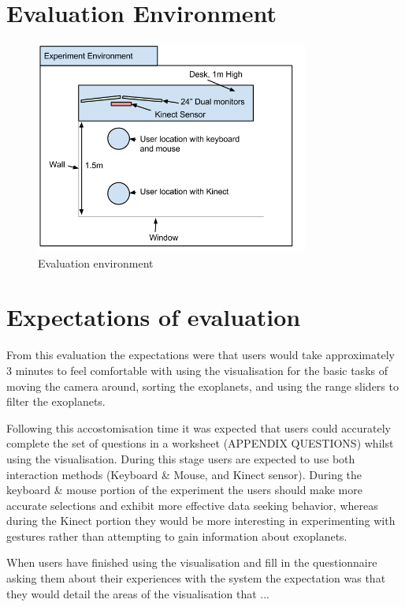 \section{Evaluation Environment}
\begin{figure}[H]
  \centering
      \includegraphics[width=0.8\textwidth]{images/environment.png}
  \caption{Evaluation environment}  
    \label{fig:environment}
\end{figure}

\section{Expectations of evaluation}
From this evaluation the expectations were that users would take approximately 3
minutes to feel comfortable with using the visualisation for the basic tasks of
moving the camera around, sorting the exoplanets, and using the range sliders to
filter the exoplanets. 

Following this accostomisation time it was expected that users could accurately
complete the set of questions in a worksheet (APPENDIX QUESTIONS) whilst using
the visualisation. During this stage users are expected to use both interaction
methods (Keyboard \& Mouse, and Kinect sensor). During the keyboard \& mouse
portion of the experiment the users should make more accurate selections and
exhibit more effective data seeking behavior, whereas during the Kinect portion
they would be more interesting in experimenting with gestures rather than
attempting to gain information about exoplanets. 

When users have finished using the visualisation and fill in the questionnaire
asking them about their experiences with the system the expectation was that
they would detail the areas of the visualisation that ...~


